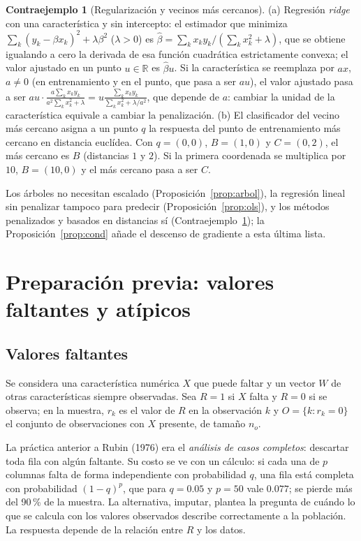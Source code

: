 \documentclass[11pt,a4paper]{article}
\theoremstyle{plain}
\theoremstyle{definition}
\newtheorem{contraejemplo}[teorema]{Contraejemplo}
\theoremstyle{remark}
\newcommand{\R}{\mathbb{R}}
\newcommand{\1}{\mathbf{1}}
\begin{document}
\begin{contraejemplo}[Regularización y vecinos más cercanos]\label{ce:ridge}
(a) Regresión \emph{ridge} con una característica y sin intercepto: el
estimador que minimiza $\sum_k(y_k-\beta x_k)^2+\lambda\beta^2$ ($\lambda>0$)
es $\hat\beta=\sum_kx_ky_k/(\sum_kx_k^2+\lambda)$, que se obtiene
igualando a cero la derivada de esa función cuadrática estrictamente
convexa; el valor ajustado en un punto $u\in\R$ es $\hat\beta u$. Si la
característica se reemplaza por $ax$, $a\ne0$ (en entrenamiento y en el
punto, que pasa a ser $au$), el valor ajustado pasa a ser
$au\cdot\frac{a\sum_kx_ky_k}{a^2\sum_kx_k^2+\lambda}
=u\frac{\sum_kx_ky_k}{\sum_kx_k^2+\lambda/a^2}$, que depende de $a$:
cambiar la unidad de la característica equivale a cambiar la penalización.
(b) El clasificador del vecino más cercano asigna a un punto $q$ la
respuesta del punto de entrenamiento más cercano en distancia euclídea.
Con $q=(0,0)$, $B=(1,0)$ y $C=(0,2)$, el más cercano es $B$ (distancias
$1$ y $2$). Si la primera coordenada se multiplica por $10$, $B=(10,0)$ y
el más cercano pasa a ser $C$.
\end{contraejemplo}

Los árboles no necesitan escalado (Proposición~\ref{prop:arbol}), la
regresión lineal sin penalizar tampoco para predecir
(Proposición~\ref{prop:ols}), y los métodos penalizados y basados en
distancias sí (Contraejemplo~\ref{ce:ridge}); la
Proposición~\ref{prop:cond} añade el descenso de gradiente a esta última
lista.

\section{Preparación previa: valores faltantes y atípicos}

\subsection{Valores faltantes}\label{sec:faltantes}

Se considera una característica numérica $X$ que puede faltar y un vector
$W$ de otras características siempre observadas. Sea $R=1$ si $X$ falta y
$R=0$ si se observa; en la muestra, $r_k$ es el valor de $R$ en la
observación $k$ y $O=\{k:r_k=0\}$ el conjunto de observaciones con $X$
presente, de tamaño $n_o$.

La práctica anterior a Rubin (1976) era el \emph{análisis de casos
completos}: descartar toda fila con algún faltante. Su costo se ve con un
cálculo: si cada una de $p$ columnas falta de forma independiente con
probabilidad $q$, una fila está completa con probabilidad $(1-q)^p$, que
para $q=0.05$ y $p=50$ vale $0.077$; se pierde más del 90\,\% de la
muestra. La alternativa, imputar, plantea la pregunta de cuándo lo que se
calcula con los valores observados describe correctamente a la población.
La respuesta depende de la relación entre $R$ y los datos.
\end{document}

